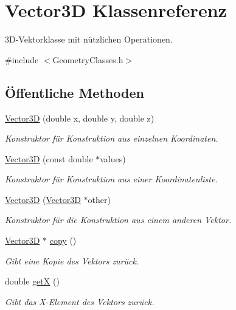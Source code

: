 \hypertarget{classVector3D}{\section{Vector3\-D Klassenreferenz}
\label{classVector3D}
}


3\-D-\/\-Vektorklasse mit nützlichen Operationen.  




{\ttfamily \#include $<$Geometry\-Classes.\-h$>$}

\subsection*{Öffentliche Methoden}
\begin{DoxyCompactItemize}
\item 
\hyperlink{classVector3D_abd851542da40b1168edcad11fa83b7c2}{Vector3\-D} (double x, double y, double z)
\begin{DoxyCompactList}\small\item\em Konstruktor für Konstruktion aus einzelnen Koordinaten. \end{DoxyCompactList}\item 
\hyperlink{classVector3D_abd023faf726edb3919c84fd8329a1f8f}{Vector3\-D} (const double $\ast$values)
\begin{DoxyCompactList}\small\item\em Konstruktor für Konstruktion aus einer Koordinatenliste. \end{DoxyCompactList}\item 
\hyperlink{classVector3D_a010bd55f41a082eccb1a7f513db29e69}{Vector3\-D} (\hyperlink{classVector3D}{Vector3\-D} $\ast$other)
\begin{DoxyCompactList}\small\item\em Konstruktor für die Konstruktion aus einem anderen Vektor. \end{DoxyCompactList}\item 
\hyperlink{classVector3D}{Vector3\-D} $\ast$ \hyperlink{classVector3D_a46dd0d9a849809a3857783102959e788}{copy} ()
\begin{DoxyCompactList}\small\item\em Gibt eine Kopie des Vektors zurück. \end{DoxyCompactList}\item 
double \hyperlink{classVector3D_aa9eaf29045bf32b95c5c7bcb2b8b68d7}{get\-X} ()
\begin{DoxyCompactList}\small\item\em Gibt das X-\/\-Element des Vektors zurück. \end{DoxyCompactList}\item 

\end{DoxyCompactItemize}
